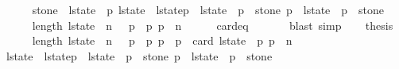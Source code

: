 \begin{isabellebody}
\ \ \ \ \isamarkupfalse%
\ {\isacharbackquoteopen}stone\ {\isasymnotin}\ l{\isacharunderscore}state\ {\isacharbang}\ p{}{\isacharbackquoteclose}\ {\isacharbackquoteopen}l{\isacharunderscore}state{\isacharprime}\ {\isacharequal}\ l{\isacharunderscore}state{\isacharbrackleft}p{}\ {\isacharcolon}{\isacharequal}\ l{\isacharunderscore}state\ {\isacharbang}\ p{}\ {\isacharminus}\ {\isacharbraceleft}stone{\isacharbraceright}{\isacharcomma}\ p{}\ {\isacharcolon}{\isacharequal}\ l{\isacharunderscore}state\ {\isacharbang}\ p{}\ {\isasymunion}\ {\isacharbraceleft}stone{\isacharbraceright}{\isacharbrackright}{\isacharbackquoteclose}\isanewline
\ \ \ \ \isamarkupfalse%
\ {\isacharbackquoteopen}length\ l{\isacharunderscore}state\ {\isacharequal}\ n\ {\isacharplus}\ {}{\isacharbackquoteclose}\ {\isacharbackquoteopen}p{}\ {\isacharless}\ p{}{\isacharbackquoteclose}\ {\isacharbackquoteopen}p{}\ {\isasymle}\ n{\isacharbackquoteclose}\isanewline
\ \ \ \ \isamarkupfalse%
\ card{\isacharunderscore}{}{\isacharunderscore}eq\isanewline
\ \ \ \ \isamarkupfalse%
\ {\isacharminus}\ {\isacharparenleft}blast{\isacharcomma}\ simp{\isacharplus}{\isacharparenright}\isanewline
\isanewline
\ \ \isamarkupfalse%
\ {\isacharquery}thesis\isanewline
\ \ \ \ \isamarkupfalse%
\ {\isacharbackquoteopen}length\ l{\isacharunderscore}state\ {\isacharequal}\ n\ {\isacharplus}\ {}{\isacharbackquoteclose}\ {\isacharbackquoteopen}p{}\ {\isacharless}\ p{}{\isacharbackquoteclose}\ {\isacharbackquoteopen}p{}\ {\isasymle}\ p{}\ {\isacharplus}\ card\ {\isacharparenleft}l{\isacharunderscore}state\ {\isacharbang}\ p{}{\isacharparenright}{\isacharbackquoteclose}\ {\isacharbackquoteopen}p{}\ {\isasymle}\ n{\isacharbackquoteclose}\isanewline
\ \ \ \ \isamarkupfalse%
\ {\isacharbackquoteopen}l{\isacharunderscore}state{\isacharprime}\ {\isacharequal}\ l{\isacharunderscore}state{\isacharbrackleft}p{}\ {\isacharcolon}{\isacharequal}\ l{\isacharunderscore}state\ {\isacharbang}\ p{}\ {\isacharminus}\ {\isacharbraceleft}stone{\isacharbraceright}{\isacharcomma}\ p{}\ {\isacharcolon}{\isacharequal}\ l{\isacharunderscore}state\ {\isacharbang}\ p{}\ {\isasymunion}\ {\isacharbraceleft}stone{\isacharbraceright}{\isacharbrackright}{\isacharbackquoteclose}\isanewline

\end{isabellebody}
